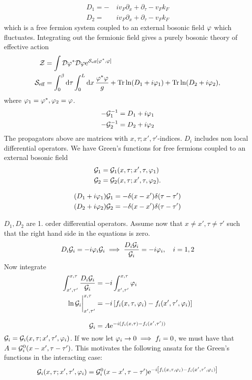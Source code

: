 \begin{align*}
D_1 = -&iv_F\partial_x+\partial_\tau-v_Fk_F \\
D_2 =\quad&iv_F\partial_x+\partial_\tau-v_Fk_F
\end{align*}
which is a free fermion system coupled to an external bosonic field $\varphi$ which fluctuates. Integrating out the fermionic field gives a purely bosonic theory of effective action
\begin{align}
\mathcal{Z} &= \int\mathcal{D}\varphi^*\mathcal{D}\varphi\mathrm{e}^{\mathcal{S}_{\text{eff}}[\varphi^*,\varphi]} \\
\label{eq:s_eff}
\mathcal{S}_{\text{eff}} &= \int_{0}^{\beta}\dd\tau\int_{0}^{L}\dd{x}\frac{\varphi^*\varphi}{g} + \Tr\ln(D_1+i\varphi_1) + \Tr\ln(D_2 +i\varphi_2),
\end{align}
where $\varphi_1 = \varphi^*, \varphi_2 = \varphi$. 
\begin{align*}
-\mathcal{G}_1^{-1} &= D_1+i\varphi_1 \\
-\mathcal{G}_2^{-1} &= D_2 +i\varphi_2
\end{align*}
The propagators above are matrices with $x, \tau;x',\tau'$-indices. $D_i$ includes non local differential operators. We have Green's functions for free fermions coupled to an external bosonic field
\begin{align*}
\mathcal{G}_1 &= \mathcal{G}_1(x, \tau;x', \tau, \varphi_1) \\\mathcal{G}_2 &= \mathcal{G}_2(x, \tau;x', \tau, \varphi_2).
\end{align*}

\begin{align}
\label{eq:gre_1}
(D_1+i\varphi_1)\mathcal{G}_1 &= -\delta(x-x')\delta(\tau-\tau') \\
\label{eq:gre_2}
(D_2 +i\varphi_2)\mathcal{G}_2 &= -\delta(x-x')\delta(\tau-\tau')
\end{align}

$D_1, D_2$ are 1. order differential operators. Assume now that $x\ne x',\tau\ne\tau'$ such that the right hand side in the equations is zero.
\[D_i\mathcal{G}_i = -i\varphi_i\mathcal{G}_i \implies \frac{D_i\mathcal{G}_i}{\mathcal{G}_i} = -i\varphi_i,\quad i = 1,2\]
Now integrate
\begin{align}
\int_{x',\tau'}^{x,\tau}\frac{D_i\mathcal{G}_i}{\mathcal{G}_i} &= -i\int_{x',\tau'}^{x,\tau}\varphi_i \\
\ln\mathcal{G}_i\bigg{|}_{x',\tau'}^{x,\tau} &= -i\left[f_i(x,\tau,\varphi_i) - f_i(x',\tau',\varphi_i)\right]
\end{align}



\[\mathcal{G}_i = A\mathrm{e}^{-i(f_i(x,\tau)-f_i(x',\tau'))}\]
$\mathcal{G}_i = \mathcal{G}_i(x,\tau;x',\tau',\varphi_i)$. If we now let $\varphi_i\rightarrow 0 \implies f_i =0$, we must have that $A = \mathcal{G}_i^0(x-x',\tau-\tau')$. This motivates the following ansatz for the Green's functions in the interacting case:
\begin{equation}
\mathcal{G}_i(x,\tau;x',\tau',\varphi_i) = \mathcal{G}_i^0(x-x',\tau-\tau')\mathrm{e}^{-i\left[f_i(x,\tau,\varphi_i) - f_i(x',\tau',\varphi_i)\right]}
\end{equation}

